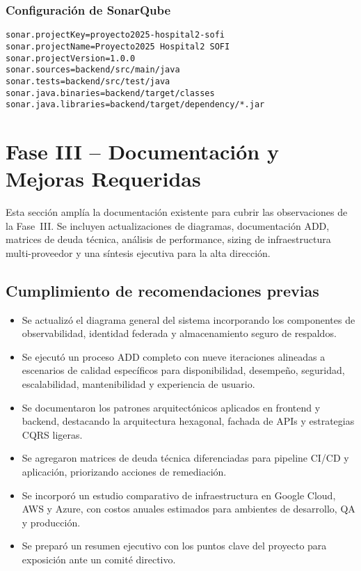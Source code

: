 \documentclass[12pt,a4paper]{article}
\begin{document}
\subsubsection{Configuración de SonarQube}
\begin{lstlisting}[language=properties]
sonar.projectKey=proyecto2025-hospital2-sofi
sonar.projectName=Proyecto2025 Hospital2 SOFI
sonar.projectVersion=1.0.0
sonar.sources=backend/src/main/java
sonar.tests=backend/src/test/java
sonar.java.binaries=backend/target/classes
sonar.java.libraries=backend/target/dependency/*.jar
\end{lstlisting}

\newpage
\section{Fase III -- Documentación y Mejoras Requeridas}

Esta sección amplía la documentación existente para cubrir las observaciones de la Fase~III. Se incluyen actualizaciones de diagramas, documentación ADD, matrices de deuda técnica, análisis de performance, sizing de infraestructura multi-proveedor y una síntesis ejecutiva para la alta dirección.

\subsection{Cumplimiento de recomendaciones previas}

\begin{itemize}[leftmargin=1.2cm]
    \item Se actualizó el diagrama general del sistema incorporando los componentes de observabilidad, identidad federada y almacenamiento seguro de respaldos.
    \item Se ejecutó un proceso ADD completo con nueve iteraciones alineadas a escenarios de calidad específicos para disponibilidad, desempeño, seguridad, escalabilidad, mantenibilidad y experiencia de usuario.
    \item Se documentaron los patrones arquitectónicos aplicados en frontend y backend, destacando la arquitectura hexagonal, fachada de APIs y estrategias CQRS ligeras.
    \item Se agregaron matrices de deuda técnica diferenciadas para pipeline CI/CD y aplicación, priorizando acciones de remediación.
    \item Se incorporó un estudio comparativo de infraestructura en Google Cloud, AWS y Azure, con costos anuales estimados para ambientes de desarrollo, QA y producción.
    \item Se preparó un resumen ejecutivo con los puntos clave del proyecto para exposición ante un comité directivo.
\end{itemize}
\end{document}

